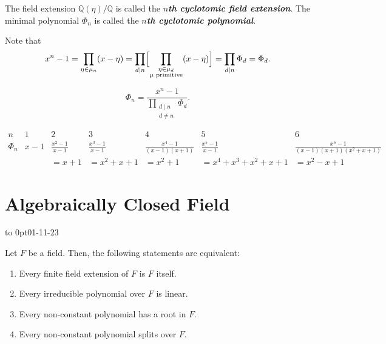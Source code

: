 \documentclass[twoside]{article}
\newcommand\Q{\mathbb Q}
\theoremstyle{remark}
\newcommand*\term[1]{\textbf{\textit{\mathversion{bold}#1}}}
\newcommand*\newclass[1]{\par\vbox to 0pt{\hbox{\tiny\sffamily\color{gray}#1}} \par\ignorespaces}
\begin{document}
\begin{definition}
  The field extension \(\Q(\eta)/\Q\) is called the \term{\(n\)th cyclotomic field extension}. The minimal polynomial \(\Phi_n\) is called the \term{\(n\)th cyclotomic polynomial}.
\end{definition}

Note that
\[ x^n-1 = \prod_{\eta \in \mu_n} (x - \eta) = \prod_{d \mid n} \Bigl[ \prod_{\substack{\eta \in \mu_d \\ \text{\(\mu\) primitive}}} (x - \eta) \Bigr] = \prod_{d \mid n} \Phi_d = \Phi_d. \]

\begin{corollary}
  \[ \Phi_n = \frac{x^n-1}{\displaystyle \prod_{\substack{d \mid n \\ d \neq n}} \Phi_d}. \]
\end{corollary}

\begin{examples}
  \begin{displaymath}
    \begin{array}{c*{6}{|c}}
      n & 1 & 2 & 3 & 4 & 5 & 6 \\ \hline
      \Phi_n & x-1 & \frac{x^2-1}{x-1} & \frac{x^3-1}{x-1} & \frac{x^4-1}{(x-1)(x+1)} & \frac{x^5-1}{x-1} & \frac{x^6-1}{(x-1)(x+1)(x^2+x+1)} \\
      && \scriptstyle = x+1 & \scriptstyle = x^2+x+1 & \scriptstyle = x^2+1 & \scriptstyle = x^4 + x^3 + x^2 + x + 1 & \scriptstyle = x^2 - x + 1
    \end{array}
  \end{displaymath}
\end{examples}

\section{Algebraically Closed Field}

\newclass{01-11-23}

\begin{proposition}
  Let \(F\) be a field. Then, the following statements are equivalent:
  \begin{enumerate}[label=\textup{(\arabic*)}, nosep]
    \item Every finite field extension of \(F\) is \(F\) itself.
    \item Every irreducible polynomial over \(F\) is linear.
    \item Every non-constant polynomial has a root in \(F\).
    \item Every non-constant polynomial splits over \(F\).
  \end{enumerate}
\end{proposition}
\end{document}
